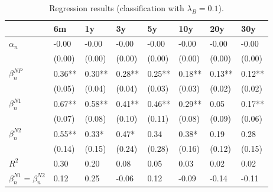 \documentclass[11pt,a4paper,english,oneside]{book}
\numberwithin{equation}{chapter}
\begin{document}
\begin{table}[h] %
	\centering %
	\begin{tabular}{ p{2cm}  p{1cm} p{1cm} p{1cm} p{1cm} p{1cm} p{1cm} p{1cm} } %
		\toprule %
		& 6m 		& 1y 		& 3y 		& 5y 		& 10y 		& 20y 		& 30y \\
		\midrule %
		$\alpha_n$ & -0.00 & -0.00 & -0.00 & -0.00 & -0.00 & -0.00 & -0.00\\
		& (0.00) & (0.00) & (0.00) & (0.00) & (0.00) & (0.00) & (0.00)\\
		$\beta_n^{NP}$ & 0.36** & 0.30** & 0.28** & 0.25** & 0.18** & 0.13** & 0.12**\\
		& (0.05) & (0.04) & (0.04) & (0.03) & (0.03) & (0.02) & (0.02)\\
		$\beta_n^{N1}$ & 0.67** & 0.58** & 0.41** & 0.46** & 0.29** & 0.05 & 0.17**\\
		& (0.07) & (0.08) & (0.10) & (0.11) & (0.08) & (0.09) & (0.06)\\
		$\beta_n^{N2}$ & 0.55** & 0.33* & 0.47* & 0.34 & 0.38* & 0.19 & 0.28\\
		& (0.14) & (0.15) & (0.24) & (0.28) & (0.16) & (0.12) & (0.15)\\
		$R^2$ & 0.30 & 0.20 & 0.08 & 0.05 & 0.03 & 0.02 & 0.02\\
		$\beta_n^{N1} = \beta_n^{N2}$ & 0.12 & 0.25 & -0.06 & 0.12 & -0.09 & -0.14 & -0.11\\
		\bottomrule %
	\end{tabular}
	\caption{Regression results (classification with $\lambda_B=0.1$).} %
	\label{tab:reg2} %
\end{table}
\end{document}
